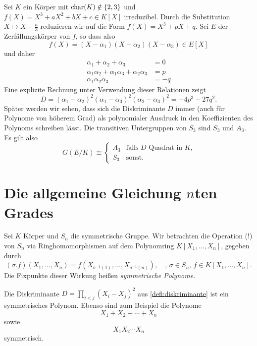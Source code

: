 \documentclass{book}
\begin{document}
\begin{exa}
    \label{exa:cubedisc}
    Sei $K$ ein Körper mit $\operatorname{char}(K) \notin \{2,3\}$ und $f(X) = X^3 + a X^2
    + bX + c \in K[X]$ irreduzibel. Durch die Substitution $X \mapsto X -
    \frac{a}{3}$ reduzieren wir auf die Form $f(X) = X^3 + p X + q$. Sei $E$ der Zerfällungskörper von $f$, so dass also
    \[
        f(X) = (X - \alpha_1) (X - \alpha_2) (X - \alpha_3) \in E[X]
    \]
    und daher
    \begin{align*}
        \alpha_1 + \alpha_2 + \alpha_3 & = 0\\
        \alpha_1\alpha_2 + \alpha_1\alpha_3 + \alpha_2\alpha_3 & = p\\
        \alpha_1\alpha_2\alpha_3 & = -q
    \end{align*}
    Eine explizite Rechnung unter Verwendung dieser Relationen zeigt
    \[
        D = (\alpha_1 - \alpha_2)^2(\alpha_1 - \alpha_3)^2(\alpha_2 - \alpha_3)^2 = -4 p^3 - 27 q^2.
    \]
    Später werden wir sehen, dass sich die Diskriminante $D$ immer (auch für
    Polynome von höherem Grad) als polynomialer Ausdruck in den Koeffizienten
    des Polynoms schreiben lässt. Die transitiven Untergruppen von $S_3$ sind
    $S_3$ und $A_3$. Es gilt also
    \[
        G(E/K) \cong \begin{cases} A_3 & \text{falls $D$ Quadrat in $K$,} \\ S_3 & \text{sonst.} \end{cases}
    \]
\end{exa}

\section{Die allgemeine Gleichung $n$ten Grades}%
\label{sub:die_allgemeine_gleichung_n_ten_grades}

Sei $K$ Körper und $S_n$ die symmetrische Gruppe. Wir betrachten die
Operation (!) von $S_n$ via Ringhomomorphismen auf dem Polynomring $K[X_1, ..., X_n]$, gegeben durch 
\begin{equation}\label{eq:snwirkung}
        (\sigma.f)(X_1, ..., X_n) = f(X_{\sigma^{-1}(1)},..., X_{\sigma^{-1}(n)}), \quad \text{, $\sigma \in S_n$, $f \in K[X_1,...,X_n]$.}
\end{equation}
Die Fixpunkte dieser Wirkung heißen \emph{symmetrische Polynome}.

\begin{exa}
    \label{exa:sym}
    Die Diskriminante $D = \prod_{i<j} (X_i - X_j)^2$ aus \eqref{defi:diskriminante} ist ein symmetrisches Polynom. Ebenso sind zum Beispiel die Polynome
    \[
        X_1 + X_2 + \cdots + X_n 
    \]
    sowie
    \[
        X_1 X_2 \cdots X_n
    \]
    symmetrisch.
\end{exa}
\end{document}
